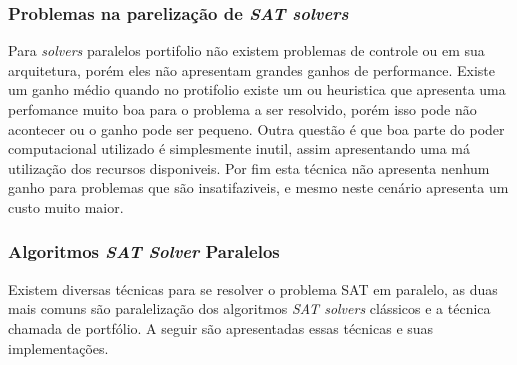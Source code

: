 \documentclass{ufsc-thesis}
\begin{document}
\subsubsection{Problemas na parelização de \textit{SAT solvers}}

Para \textit{solvers} paralelos portifolio não existem problemas de controle ou em 
sua arquitetura, porém eles não apresentam grandes ganhos de performance. Existe um 
ganho médio quando no protifolio existe um  ou heuristica que apresenta 
uma perfomance muito boa para o problema a ser resolvido, porém isso pode não acontecer ou 
o ganho pode ser pequeno. Outra questão é que boa parte do poder computacional utilizado 
é simplesmente inutil, assim apresentando uma má utilização dos recursos disponiveis. Por 
fim esta técnica não apresenta nenhum ganho para problemas que são insatifaziveis, e mesmo 
neste cenário apresenta um custo muito maior.

%
%
%
%

\subsubsection{Algoritmos \textit{SAT Solver} Paralelos}
\label{sec:satparallel}

Existem diversas técnicas para se resolver o problema SAT em paralelo, as duas mais 
comuns são paralelização dos algoritmos \textit{SAT solvers} clássicos e a técnica 
chamada de portfólio. A seguir são apresentadas essas técnicas e  suas implementações.
\end{document}
